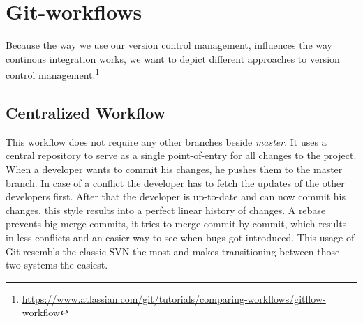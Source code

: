 \section{Git-workflows}

Because the way we use our version control management, influences the way
continous integration works, we want to depict different approaches to version
control
management.\footnote{\url{https://www.atlassian.com/git/tutorials/comparing-workflows/gitflow-workflow}}

\subsection{Centralized Workflow}\label{sec:Centralized Workflow}
This workflow does not require any other branches beside \textit{master}. It uses a central repository to serve as a single point-of-entry for all changes to the project.
When a developer wants to commit his changes, he pushes them to the master branch. In case of a conflict the developer has to fetch the updates of the other developers first.
After that the developer is up-to-date and can now commit his changes, this style results into a perfect linear history of changes.
A rebase prevents big merge-commits, it tries to merge commit by commit, which results in less conflicts and an easier way to see when bugs got introduced.
This usage of Git resembls the classic SVN the most and makes transitioning between those two systems the easiest. \\

